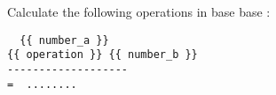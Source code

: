 Calculate  the following operations in base {{ base }} : \hfill{}
\begin{verbatim}
  {{ number_a }}
{{ operation }} {{ number_b }}
-------------------
=  ........
\end{verbatim}



